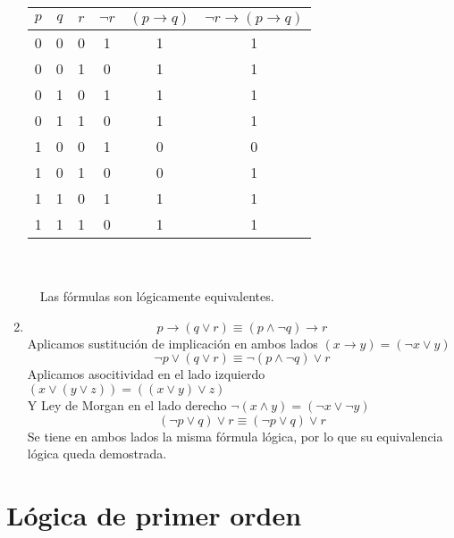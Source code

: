 \documentclass[11pt]{utalcaDoc}
\begin{document}
\begin{enumerate}
\begin{tabular}{|c|c|c||c|c|c|}
\hline 
$p$ & $q$ & $r$ & $\neg r$ & $(p \to q)$ & $\neg r \to (p \to q)$ \\
\hline 
0 & 0 & 0 & 1 & 1 & 1 \\ 
\hline 
0 & 0 & 1 & 0 & 1 & 1 \\ 
\hline 
0 & 1 & 0 & 1 & 1 & 1 \\ 
\hline 
0 & 1 & 1 & 0 & 1 & 1 \\ 
\hline 
1 & 0 & 0 & 1 & 0 & 0 \\ 
\hline 
1 & 0 & 1 & 0 & 0 & 1 \\ 
\hline 
1 & 1 & 0 & 1 & 1 & 1 \\ 
\hline 
1 & 1 & 1 & 0 & 1 & 1 \\ 
\hline 
\end{tabular}
\\ \\ \ \
Las fórmulas son lógicamente equivalentes.

\newpage
\item

\[ p \to (q \lor r) \equiv (p \wedge \neg q) \to r \]
Aplicamos sustitución de implicación en ambos lados $(x \to y) = (\neg x \lor y)$
\[ \neg p \lor (q \lor r) \equiv \neg (p \wedge \neg q) \lor r \]
Aplicamos asocitividad en el lado izquierdo $(x \lor (y \lor z)) = ((x \lor y) \lor z)$ \\
Y Ley de Morgan en el lado derecho $\neg(x \wedge y) = (\neg x \lor \neg y)$
\[ (\neg p \lor q) \lor r \equiv (\neg p \lor q) \lor r \]
Se tiene en ambos lados la misma fórmula lógica, por lo que su equivalencia lógica queda demostrada.
\end{enumerate}
\newpage
\section{Lógica de primer orden}


\subsection{ } %
\end{document}
